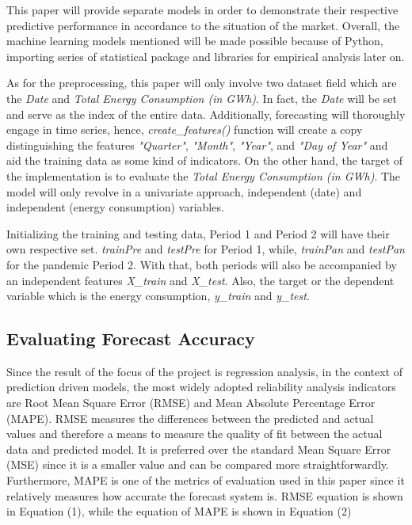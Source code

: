 \documentclass[runningheads]{llncs}
\begin{document}
This paper will provide separate models in order to demonstrate their respective predictive performance in accordance to the situation of the market. Overall, the machine learning models mentioned will be made possible because of Python, importing series of statistical package and libraries for empirical analysis later on.

As for the preprocessing, this paper will only involve two dataset field which are the \textit{Date} and \textit{Total Energy Consumption (in GWh)}. In fact, the \textit{Date} will be set and serve as the index of the entire data. Additionally, forecasting will thoroughly engage in time series, hence, \textit{create\_features()} function will create a copy distinguishing the features \textit{"Quarter"}, \textit{"Month"}, \textit{"Year"}, and \textit{"Day of Year"} and aid the training data as some kind of indicators. On the other hand, the target of the implementation is to evaluate the \textit{Total Energy Consumption (in GWh)}. The model will only revolve in a univariate approach, independent (date) and independent (energy consumption) variables.

Initializing the training and testing data, Period 1 and Period 2 will have their own respective set. \textit{trainPre} and \textit{testPre} for Period 1, while, \textit{trainPan} and \textit{testPan} for the pandemic Period 2. With that, both periods will also be accompanied by an independent features \textit{X\_train} and \textit{X\_test}. Also, the target or the dependent variable which is the energy consumption, \textit{y\_train} and \textit{y\_test}.

\subsection{Evaluating Forecast Accuracy}
Since the result of the focus of the project is regression analysis, in the context of prediction driven models, the most widely adopted reliability analysis indicators are Root Mean Square Error (RMSE) and Mean Absolute Percentage Error (MAPE). RMSE measures the differences between the predicted and actual values and therefore a means to measure the quality of fit between the actual data and predicted model. It is preferred over the standard Mean Square Error (MSE) since it is a smaller value and can be compared more straightforwardly. Furthermore, MAPE is one of the metrics of evaluation used in this paper since it relatively measures how accurate the forecast system is. RMSE equation is shown in Equation (1), while the equation of MAPE is shown in Equation (2) \\
\end{document}
